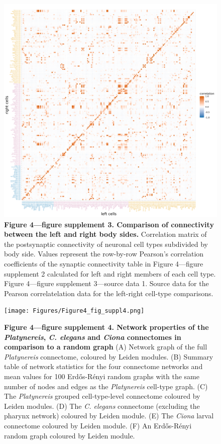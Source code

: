 \documentclass[
  11pt,
]{article}
\begin{document}
\begin{figure}[H]

{\centering \includegraphics[width=1\textwidth,height=\textheight]{Figures/Figure4_fig_suppl3.png}

}

\caption{\textbf{Figure 4---figure supplement 3. Comparison of
connectivity between the left and right body sides.} Correlation matrix
of the postsynaptic connectivity of neuronal cell types subdivided by
body side. Values represent the row-by-row Pearson's correlation
coefficients of the synaptic connectivity table in Figure 4---figure
supplement 2 calculated for left and right members of each cell type.
Figure 4---figure supplement 3---source data 1. Source data for the
Pearson correlatelation data for the left-right cell-type comparisons.}

\end{figure}%

\begin{figure}[H]

{\centering \texttt{[image: Figures/Figure4\_fig\_suppl4.png]}

}

\caption{\textbf{Figure 4---figure supplement 4. Network properties of
the \emph{Platynereis}, \emph{C. elegans} and \emph{Ciona} connectomes
in comparison to a random graph } (A) Network graph of the full
\emph{Platynereis} connectome, coloured by Leiden modules. (B) Summary
table of network statistics for the four connectome networks and mean
values for 100 Erdős-Rényi random graphs with the same number of nodes
and edges as the \emph{Platynereis} cell-type graph. (C) The
\emph{Platynereis} grouped cell-type-level connectome coloured by Leiden
modules. (D) The \emph{C. elegans} connectome (excluding the pharynx
network) coloured by Leiden module. (E) The \emph{Ciona} larval
connectome coloured by Leiden module. (F) An Erdős-Rényi random graph
coloured by Leiden module.}

\end{figure}%
\end{document}
